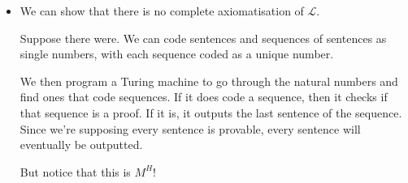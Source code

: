 \documentclass[justified]{tufte-handout}
\begin{document}
\begin{itemize}
\vspace{.2cm}

\item We can show that there is no complete axiomatisation of $\mathcal{L}$.
\vspace{.2cm}

 \noindent Suppose there were. We can code sentences and sequences of sentences as single numbers, with each sequence coded as a unique number. 

\vspace{.2cm}

 \noindent We then program a Turing machine to go through the natural numbers and find ones that code sequences. If it does code a sequence, then it checks if that sequence is a proof. If it is, it outputs the last sentence of the sequence. Since we're supposing every sentence is provable, every sentence will eventually be outputted.
 
 \vspace{.2cm}

 \noindent But notice that this is $M^H$!



\end{itemize}
 
 
 
\end{document}
